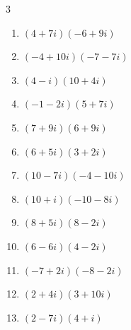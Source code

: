 \begin{multicols}{3}
\begin{enumerate}
  \item $\displaystyle (4+7i)(-6+9i)$

        \phantom{$\displaystyle =-87-6i$}

  \item $\displaystyle (-4+10i)(-7-7i)$

        \phantom{$\displaystyle =98-42i$}

  \item $\displaystyle (4-i)(10+4i)$

        \phantom{$\displaystyle =44+6i$}

  \item $\displaystyle (-1-2i)(5+7i)$

        \phantom{$\displaystyle =9-17i$}

  \item $\displaystyle (7+9i)(6+9i)$

        \phantom{$\displaystyle =-39+117i$}

  \item $\displaystyle (6+5i)(3+2i)$

        \phantom{$\displaystyle =8+27i$}

  \item $\displaystyle (10-7i)(-4-10i)$

        \phantom{$\displaystyle =-110-72i$}

  \item $\displaystyle (10+i)(-10-8i)$

        \phantom{$\displaystyle =-92-90i$}

\columnbreak %

  \item $\displaystyle (8+5i)(8-2i)$

        \phantom{$\displaystyle =74+24i$}

  \item $\displaystyle (6-6i)(4-2i)$

        \phantom{$\displaystyle =12-36i$}

  \item $\displaystyle (-7+2i)(-8-2i)$

        \phantom{$\displaystyle =60-2i$}

  \item $\displaystyle (2+4i)(3+10i)$

        \phantom{$\displaystyle =-34+32i$}

  \item $\displaystyle (2-7i)(4+i)$


\end{enumerate}
\end{multicols}
